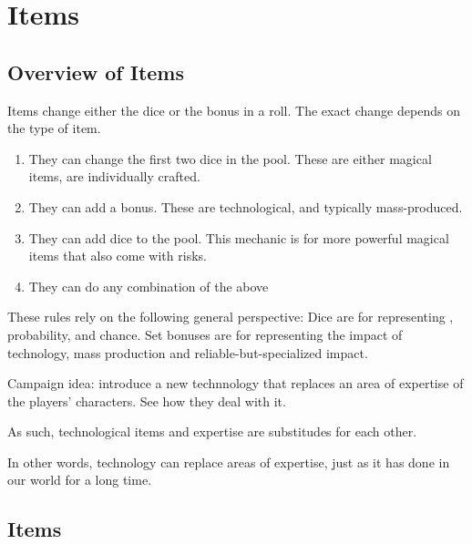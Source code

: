 \chapterspaceabove{6.75cm}
\chapterspacebelow{11.25cm}


\chapter*{Items}

\section*{Overview of Items}

Items change either the dice or the bonus in a roll.
The exact change depends on the type of item.

\begin{enumerate}
	\item They can change the first two dice in the pool. These are either magical items, are individually crafted.
	\item They can add a bonus. These are technological, and typically mass-produced.
	\item They can add dice to the pool. This mechanic is for more powerful magical items that also come with risks.
	\item They can do any combination of the above
\end{enumerate}


These rules rely on the following general perspective:
Dice are for representing , probability, and chance.
Set bonuses are for representing the impact of technology, mass production and reliable-but-specialized impact.
\begin{marginNote}
	Campaign idea: introduce a new technnology that replaces an area of expertise of the players' characters. See how they deal with it.
\end{marginNote}
As such, technological items and expertise are substitudes for each other.


\begin{emphasisParagraph}
	In other words, technology can replace areas of expertise, just as it has done in our world for a long time.
\end{emphasisParagraph}

\section*{Items}
\label{sec:items_table}

